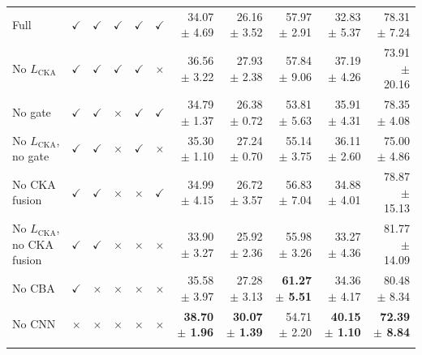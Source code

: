 \documentclass[10pt]{article}
\begin{document}
{\begin{longtable}{lccccc rrrrr}
\addlinespace[4pt]
\multicolumn{11}{l}{\textit{Source: USOVA $\rightarrow$ Target: OVATUS}} \\
\midrule
Full & $\checkmark$ & $\checkmark$ & $\checkmark$ & $\checkmark$ & $\checkmark$ & 34.07 $\pm$ 4.69 & 26.16 $\pm$ 3.52 & 57.97 $\pm$ 2.91 & 32.83 $\pm$ 5.37 & 78.31 $\pm$ 7.24 \\
No $L_{\mathrm{CKA}}$ & $\checkmark$ & $\checkmark$ & $\checkmark$ & $\checkmark$ & $\times$ & 36.56 $\pm$ 3.22 & 27.93 $\pm$ 2.38 & 57.84 $\pm$ 9.06 & 37.19 $\pm$ 4.26 & 73.91 $\pm$ 20.16 \\
No gate & $\checkmark$ & $\checkmark$ & $\times$ & $\checkmark$ & $\checkmark$ & 34.79 $\pm$ 1.37 & 26.38 $\pm$ 0.72 & 53.81 $\pm$ 5.63 & 35.91 $\pm$ 4.31 & 78.35 $\pm$ 4.08 \\
No $L_{\mathrm{CKA}}$, no gate & $\checkmark$ & $\checkmark$ & $\times$ & $\checkmark$ & $\times$ & 35.30 $\pm$ 1.10 & 27.24 $\pm$ 0.70 & 55.14 $\pm$ 3.75 & 36.11 $\pm$ 2.60 & 75.00 $\pm$ 4.86 \\
No CKA fusion & $\checkmark$ & $\checkmark$ & $\times$ & $\times$ & $\checkmark$ & 34.99 $\pm$ 4.15 & 26.72 $\pm$ 3.57 & 56.83 $\pm$ 7.04 & 34.88 $\pm$ 4.01 & 78.87 $\pm$ 15.13 \\
No $L_{\mathrm{CKA}}$, no CKA fusion & $\checkmark$ & $\checkmark$ & $\times$ & $\times$ & $\times$ & 33.90 $\pm$ 3.27 & 25.92 $\pm$ 2.36 & 55.98 $\pm$ 3.26 & 33.27 $\pm$ 4.36 & 81.77 $\pm$ 14.09 \\
No CBA & $\checkmark$ & $\times$ & $\times$ & $\times$ & $\times$ & 35.58 $\pm$ 3.97 & 27.28 $\pm$ 3.13 & \textbf{61.27 $\pm$ 5.51} & 34.36 $\pm$ 4.17 & 80.48 $\pm$ 8.34 \\
No CNN & $\times$ & $\times$ & $\times$ & $\times$ & $\times$ & \textbf{38.70 $\pm$ 1.96} & \textbf{30.07 $\pm$ 1.39} & 54.71 $\pm$ 2.20 & \textbf{40.15 $\pm$ 1.10} & \textbf{72.39 $\pm$ 8.84} \\
\addlinespace[4pt]
\end{longtable}
}
\end{document}
